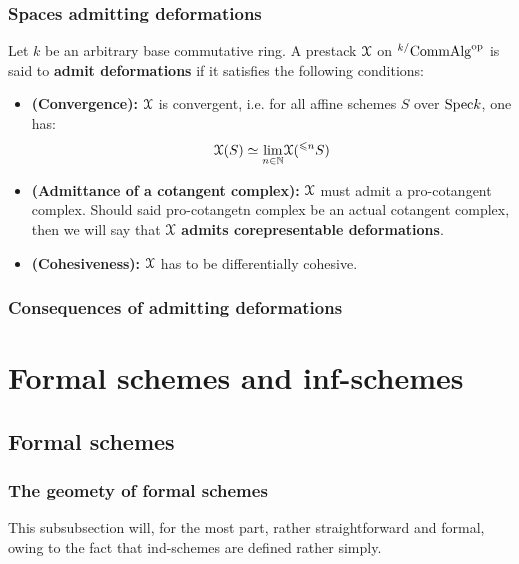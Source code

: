             \subsubsection{Spaces admitting deformations}
                \begin{definition} \label{def: prestacks_admitting_deformations}
                    Let $k$ be an arbitrary base commutative ring. A prestack $\mathcal{X}$ on ${}^{k/}\mathrm{Comm}\mathrm{Alg}^{\mathrm{op}}$ is said to \textbf{admit deformations} if it satisfies the following conditions:
                        \begin{itemize}
                            \item \textbf{(Convergence):} $\mathcal{X}$ is convergent, i.e. for all affine schemes $S$ over $\mathrm{Spec} k$, one has:
                                $$\mathcal{X}(S) \simeq \underset{n \in \mathbb{N}}{\operatorname{lim}} \mathcal{X}({}^{\leqslant n}S)$$
                            \item \textbf{(Admittance of a cotangent complex):} $\mathcal{X}$ must admit a pro-cotangent complex. Should said pro-cotangetn complex be an actual cotangent complex, then we will say that $\mathcal{X}$ \textbf{admits corepresentable deformations}.
                            \item \textbf{(Cohesiveness):} $\mathcal{X}$ has to be differentially cohesive.
                        \end{itemize}
                \end{definition}
            
            \subsubsection{Consequences of admitting deformations}
            
    \section{Formal schemes and inf-schemes} \label{section: formal_schemes_and_inf_schemes}
        \subsection{Formal schemes}
            \subsubsection{The geomety of formal schemes}
                This subsubsection will, for the most part, rather straightforward and formal, owing to the fact that ind-schemes are defined rather simply.
                
